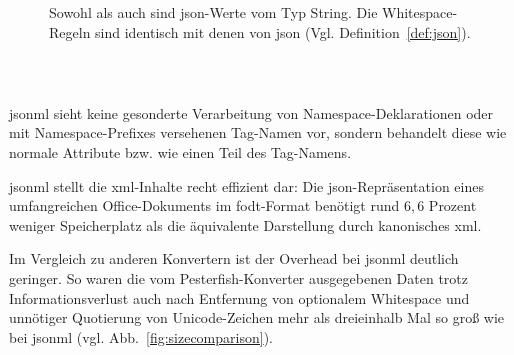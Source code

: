 \begin{figure}[H]
    \begin{definition}
        \label{def:jsonml}
        Sowohl  als auch  sind \acrshort{json}-Werte vom Typ String. Die Whitespace-Regeln sind identisch mit denen von \acrshort{json} (Vgl. Definition~\ref{def:json}).
        \begin{grammar}
            
        \end{grammar}
    \end{definition}
\end{figure}

\begin{figure}[h]
    \begin{example}~
    \inputminted{json}{xmltree.json}
    \label{fig:xmltreejsonml}
    \end{example}
\end{figure}

\acrshort{jsonml} sieht keine gesonderte Verarbeitung von Namespace-Deklarationen oder mit Namespace-Prefixes versehenen Tag-Namen vor, sondern behandelt diese wie normale Attribute bzw. wie einen Teil des Tag-Namens.

\acrshort{jsonml} stellt die \acrshort{xml}-Inhalte recht effizient dar: Die \acrshort{json}-Repräsentation eines umfangreichen Office-Dokuments im \acrshort{fodt}-Format benötigt rund $6,6$ Prozent weniger Speicherplatz als die äquivalente Darstellung durch kanonisches \acrshort{xml}.

Im Vergleich zu anderen Konvertern ist der Overhead bei \acrshort{jsonml} deutlich geringer. So waren die vom Pesterfish-Konverter ausgegebenen Daten trotz Informationsverlust auch nach Entfernung von optionalem Whitespace und unnötiger Quotierung von Unicode-Zeichen mehr als dreieinhalb Mal so groß wie bei \acrshort{jsonml} (vgl. Abb.~\ref{fig:sizecomparison}).

